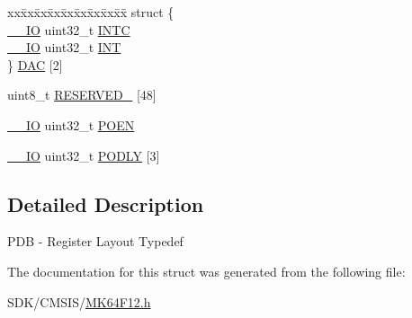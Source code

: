 \begin{DoxyCompactItemize}
\begin{tabbing}
\end{tabbing}\item 
\begin{tabbing}
xx\=xx\=xx\=xx\=xx\=xx\=xx\=xx\=xx\=\kill
struct \{\\
\>\mbox{\hyperlink{core__cm4_8h_aec43007d9998a0a0e01faede4133d6be}{\_\_IO}} uint32\_t \mbox{\hyperlink{group___v_r_e_f___peripheral___access___layer_ga1d2660ebf6d20840dfeb986ccf7af4f3}{INTC}}\\
\>\mbox{\hyperlink{core__cm4_8h_aec43007d9998a0a0e01faede4133d6be}{\_\_IO}} uint32\_t \mbox{\hyperlink{group___v_r_e_f___peripheral___access___layer_gafab15a0b540bc4e09cc8b0dcabe8791f}{INT}}\\
\} \mbox{\hyperlink{group___v_r_e_f___peripheral___access___layer_gae118976c5526888e4385d2b45e4ca8ac}{DAC}} \mbox{[}2\mbox{]}\\

\end{tabbing}\item 
uint8\+\_\+t \mbox{\hyperlink{group___v_r_e_f___peripheral___access___layer_gad8a834e9c0be4b8a1f57679868c10f2d}{R\+E\+S\+E\+R\+V\+E\+D\+\_}} \mbox{[}48\mbox{]}
\item 
\mbox{\hyperlink{core__cm4_8h_aec43007d9998a0a0e01faede4133d6be}{\+\_\+\+\_\+\+IO}} uint32\+\_\+t \mbox{\hyperlink{group___v_r_e_f___peripheral___access___layer_gafd7953396f7b3622bc91168b9cfd6aae}{P\+O\+EN}}
\item 
\mbox{\hyperlink{core__cm4_8h_aec43007d9998a0a0e01faede4133d6be}{\+\_\+\+\_\+\+IO}} uint32\+\_\+t \mbox{\hyperlink{group___v_r_e_f___peripheral___access___layer_gae44cca13adf17daf17265abea2edb710}{P\+O\+D\+LY}} \mbox{[}3\mbox{]}
\end{DoxyCompactItemize}


\subsection{Detailed Description}
P\+DB -\/ Register Layout Typedef 

The documentation for this struct was generated from the following file\+:\begin{DoxyCompactItemize}
\item 
S\+D\+K/\+C\+M\+S\+I\+S/\mbox{\hyperlink{_m_k64_f12_8h}{M\+K64\+F12.\+h}}\end{DoxyCompactItemize}
